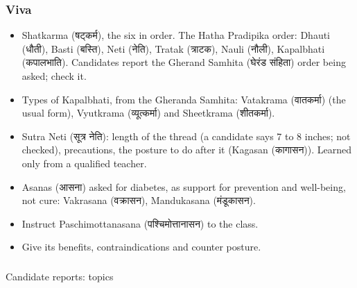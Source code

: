 \begin{frame}[fragile]\frametitle{Viva}
    \begin{itemize}
        \item Shatkarma (षट्कर्म), the six in order. The Hatha Pradipika order: Dhauti (धौती), Basti (बस्ति), Neti (नेति), Tratak (त्राटक), Nauli (नौली), Kapalbhati (कपालभाति). Candidates report the Gherand Samhita (घेरंड संहिता) order being asked; check it.
        \item Types of Kapalbhati, from the Gheranda Samhita: Vatakrama (वातकर्मा) (the usual form), Vyutkrama (व्यूत्कर्मा) and Sheetkrama (शीतकर्मा).
        \item Sutra Neti (सूत्र नेति): length of the thread (a candidate says 7 to 8 inches; not checked), precautions, the posture to do after it (Kagasan (कागासन)). Learned only from a qualified teacher.
        \item Asanas (आसना) asked for diabetes, as support for prevention and well-being, not cure: Vakrasana (वक्रासन), Mandukasana (मंडूकासन).
        \item Instruct Paschimottanasana (पश्चिमोत्तानासन) to the class.
        \item Give its benefits, contraindications and counter posture.
    \end{itemize}
\end{frame}

\begin{frame}[fragile]\frametitle{}
\begin{center}
{\Large Candidate reports: topics}
\end{center}
\end{frame}

